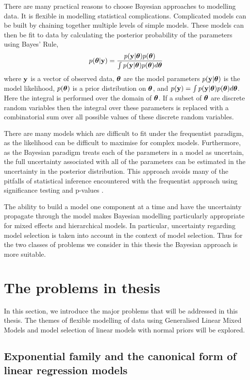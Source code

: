 There are many practical reasons to choose Bayesian approaches to modelling data. It is flexible in modelling
statistical complications. Complicated models can be built by chaining together multiple levels of simple
models. These models can then be fit to data by calculating the posterior probability of the parameters using
Bayes' Rule,
\[
	p({\boldsymbol \theta} | {\bf y}) = \frac{p({\bf y} | {\boldsymbol \theta}) p({\boldsymbol \theta})}{\int p({\bf y} | {\boldsymbol \theta}) p({\boldsymbol \theta}) d {\boldsymbol \theta}}
\]
where ${\bf y}$ is a vector of observed data, ${\boldsymbol \theta}$ are the model parameters $p({\bf y}|{\boldsymbol \theta})$ is the model
likelihood, $p({\boldsymbol \theta})$ is a prior distribution on ${\boldsymbol \theta}$, and $p({\bf y})=\int
p({\bf y}|{\boldsymbol \theta})p({\boldsymbol \theta})d{\boldsymbol \theta}$. Here the integral is performed over the domain of ${\boldsymbol \theta}$. If a subset of
${\boldsymbol \theta}$ are discrete random variables then the integral over these parameters is replaced with a
combinatorial sum over all possible values of these discrete random variables.

There are many models which are difficult to fit under the frequentist paradigm, as the likelihood can be
difficult to maximise for complex models. Furthermore, as the Bayesian paradigm treats each of the parameters
in a model as uncertain, the full uncertainty associated with all of the parameters can be estimated in the
uncertainty in the posterior distribution. This approach avoids many of the pitfalls of statistical inference
encountered with the frequentist approach using significance testing and p-values \citep{Cox2005}.

The ability to build a model one component at a time and have the uncertainty propagate through the model
makes Bayesian modelling  particularly appropriate for mixed effects and hierarchical models. In particular,
uncertainty regarding model selection is taken into account in the context of model selection. Thus for the
two classes of problems we consider in this thesis the Bayesian approach is more suitable.

\section{The problems in thesis}

In this section, we introduce the major problems that will be addressed in this thesis. The themes of flexible
modelling of data using Generalised Linear Mixed Models and model selection of linear models with normal
priors  will be explored.

\subsection{Exponential family and the canonical form of linear regression models}

